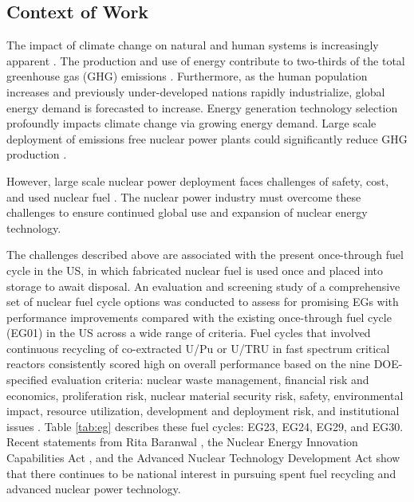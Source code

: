 \subsection{Context of Work}
The impact of climate change on natural and human systems 
is increasingly apparent \cite{noauthor_climate_2018}.
The production and use of energy contribute to 
two-thirds of the total greenhouse gas (GHG) 
emissions \cite{noauthor_climate_2018}.
Furthermore, as the human population increases and previously 
under-developed nations rapidly industrialize, 
global energy demand is forecasted to increase. 
Energy generation technology selection 
profoundly impacts climate change via growing energy demand. 
Large scale deployment of emissions free nuclear power plants 
could significantly reduce GHG production 
\cite{noauthor_climate_2018}.    

However, large scale nuclear power deployment faces
challenges of safety, cost, and used nuclear fuel  
\cite{noauthor_future_2018}. 
The nuclear power industry must overcome these challenges 
to ensure continued global use and expansion 
of nuclear energy technology. 

The challenges described above are associated with 
the present once-through fuel cycle in the \gls{US}, 
in which fabricated nuclear fuel is used once and placed into 
storage to await disposal. 
An evaluation and screening study of a comprehensive set of nuclear 
fuel cycle options \cite{wigeland_nuclear_2014} was conducted to assess 
for promising \glspl{EG} with performance improvements compared with 
the existing once-through 
fuel cycle (EG01) in the \gls{US} across a wide range of criteria. 
Fuel cycles that involved continuous recycling
of co-extracted U/Pu or U/TRU in fast spectrum critical reactors
consistently scored high on overall performance based on the nine 
DOE-specified evaluation criteria: nuclear waste management, 
financial risk and economics, 
proliferation risk, nuclear material security risk, safety, 
environmental impact, resource utilization, development and deployment 
risk, and institutional issues \cite{wigeland_nuclear_2014}. 
Table \ref{tab:eg} describes these fuel cycles:
EG23, EG24, EG29, and EG30. 
Recent statements from Rita Baranwal \cite{noauthor_new_2019}, the Nuclear 
Energy Innovation Capabilities Act \cite{crapo_s97_2018}, and the 
Advanced Nuclear Technology Development Act \cite{latta_hr590_2017} 
show that there continues to be national interest in pursuing spent 
fuel recycling and advanced nuclear power technology. 

